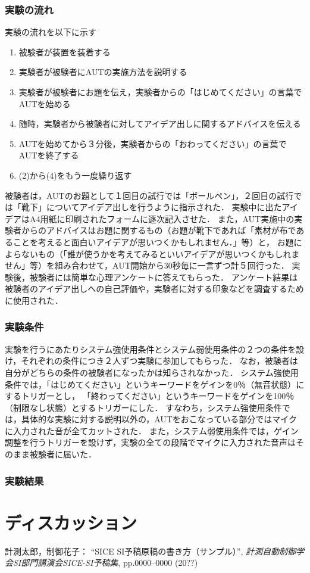 \documentclass[a4paper]{jarticle}
\begin{document}
\subsubsection{実験の流れ}
実験の流れを以下に示す
\begin{enumerate}
    \item 被験者が装置を装着する
    \item 実験者が被験者にAUTの実施方法を説明する
    \item 実験者が被験者にお題を伝え，実験者からの「はじめてください」の言葉でAUTを始める
    \item 随時，実験者から被験者に対してアイデア出しに関するアドバイスを伝える
    \item AUTを始めてから３分後，実験者からの「おわってください」の言葉でAUTを終了する
    \item (2)から(4)をもう一度繰り返す
\end{enumerate}
被験者は，AUTのお題として１回目の試行では「ボールペン」，２回目の試行では「靴下」についてアイデア出しを行うように指示された．
実験中に出たアイデアはA4用紙に印刷されたフォームに逐次記入させた．
また，AUT実施中の実験者からのアドバイスはお題に関するもの（お題が靴下であれば「素材が布であることを考えると面白いアイデアが思いつくかもしれません．」等）と，
お題によらないもの（「誰が使うかを考えてみるといいアイデアが思いつくかもしれません」等）を組み合わせて，AUT開始から30秒毎に一言ずつ計５回行った．
実験後，被験者には簡単な心理アンケートに答えてもらった．
アンケート結果は被験者のアイデア出しへの自己評価や，実験者に対する印象などを調査するために使用された．

\subsubsection{実験条件}
実験を行うにあたりシステム強使用条件とシステム弱使用条件の２つの条件を設け，それぞれの条件につき２人ずつ実験に参加してもらった．
なお，被験者は自分がどちらの条件の被験者になったかは知らされなかった．
システム強使用条件では，「はじめてください」というキーワードをゲインを0％（無音状態）にするトリガーとし，
「終わってください」というキーワードをゲインを100％（制限なし状態）とするトリガーにした．
すなわち，システム強使用条件では，具体的な実験に対する説明以外の，AUTをおこなっている部分ではマイクに入力された音が全てカットされた．
また，システム弱使用条件では，ゲイン調整を行うトリガーを設けず，実験の全ての段階でマイクに入力された音声はそのまま被験者に届いた．

\subsubsection{実験結果}
\section{ディスカッション}
%
%
\begin{thebibliography}{99}
	計測太郎，制御花子：
	``SICE SI予稿原稿の書き方（サンプル）'',  
   {\it 計測自動制御学会SI部門講演会SICE-SI予稿集}, 
    pp.0000--0000 (20??)
\end{thebibliography}
%
%
%
\end{document}
